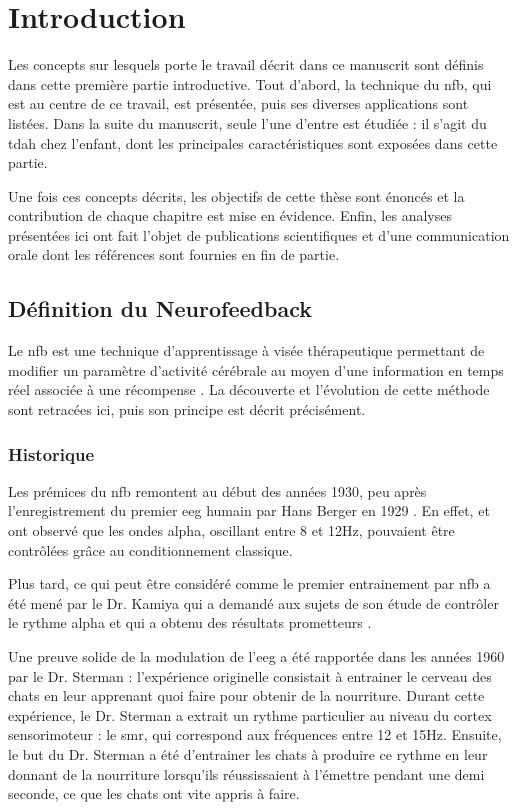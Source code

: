 \chapter{Introduction} \label{chapitre-1}

Les concepts sur lesquels porte le travail décrit dans ce manuscrit sont définis dans cette première partie introductive. Tout d'abord, la technique du \gls{nfb}, 
qui est au centre de ce travail, est présentée, puis ses diverses applications sont listées. Dans la suite du manuscrit, seule l'une d'entre est étudiée : 
il s'agit du \gls{tdah} chez l'enfant, dont les principales caractéristiques sont exposées dans cette partie. 

Une fois ces concepts décrits, les objectifs de cette thèse sont énoncés et la contribution de chaque chapitre est mise en évidence. Enfin, les analyses 
présentées ici ont fait l'objet de publications scientifiques et d'une communication orale dont les références sont fournies en fin de partie. 

\clearpage 

\section{Définition du Neurofeedback}

Le \gls{nfb} est une technique d’apprentissage à visée thérapeutique permettant de modifier un paramètre d’activité cérébrale au moyen d’une 
information en temps réel associée à une récompense \citep{Arns2014}. 
La découverte et l'évolution de cette méthode sont retracées ici, puis son principe est décrit précisément.

\subsection{Historique}

Les prémices du \gls{nfb} remontent au début des années 1930, peu après l'enregistrement du premier \gls{eeg} humain par Hans Berger en 1929 \citep{Berger1929}.
En effet, \citet{Durup1935} et \citet{Loomis1936} ont observé que les ondes alpha, oscillant entre 8 et 12Hz, pouvaient être contrôlées grâce au 
conditionnement classique. 

Plus tard, ce qui peut être considéré comme le premier entrainement par \gls{nfb} a été mené par le Dr. Kamiya qui a demandé aux sujets de son étude 
de contrôler le rythme alpha et qui a obtenu des résultats prometteurs \citep{Kamiya1969}. 

Une preuve solide de la modulation de l'\gls{eeg} a été rapportée dans les années 1960 par le Dr. Sterman : l'expérience 
originelle consistait à entrainer le cerveau des chats en leur apprenant quoi faire pour obtenir de 
la nourriture. Durant cette expérience, le Dr. Sterman a extrait un rythme particulier au niveau du cortex sensorimoteur : le \gls{smr}, qui correspond 
aux fréquences entre 12 et 15Hz. Ensuite, le but du Dr. Sterman a été d'entrainer les chats à produire ce rythme en leur donnant de la nourriture 
lorsqu'ils réussissaient à l'émettre pendant une demi seconde, ce que les chats ont vite appris à faire. 

